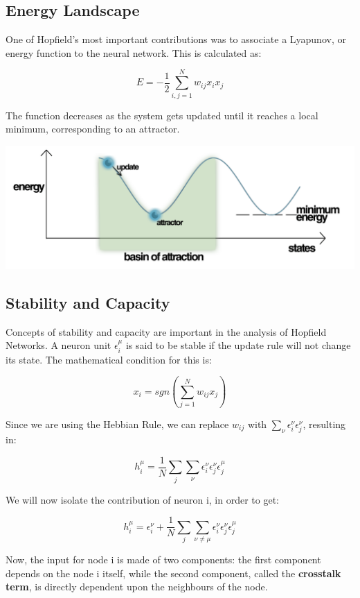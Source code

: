 \subsection{Energy Landscape}

One of Hopfield's most important contributions was to associate a Lyapunov, or energy function to the neural network. This is calculated as:

\[ E = -\frac{1}{2} \sum_{i,j=1}^{N}w_{ij}x_{i}x_{j} \]

The function decreases as the system gets updated until it reaches a local minimum, corresponding to an attractor.

\includegraphics[scale=0.25]{energy_landscape.png}

\subsection{Stability and Capacity}

Concepts of stability and capacity are important in the analysis of Hopfield Networks. A neuron unit \( \epsilon_{i}^{\mu}\) is said to be stable if the update rule will not change its state. The mathematical condition for this is:

 \[x_{i} = sgn(\sum_{j=1}^{N}w_{ij}x_{j}) \]

Since we are using the Hebbian Rule, we can replace \(w_{ij}\) with
\(\sum_{\nu}\epsilon_{i}^{\nu}\epsilon_{j}^{\nu}\), resulting in:

\[ h_{i}^{\mu} = \frac{1}{N}\sum_{j} \sum_{\nu} \epsilon_{i}^{\nu}
						 \epsilon_{j}^{\nu}
						 \epsilon_{j}^{\mu}\]
 
 We will now isolate the contribution of neuron i, in order to get:
 
\[ h_{i}^{\mu} = \epsilon_{i}^{\nu} + \frac{1}{N}\sum_{j} \sum_{\nu\neq\mu} 			 					 \epsilon_{i}^{\nu}
						 \epsilon_{j}^{\nu}
						 \epsilon_{j}^{\mu}\]
 
 Now, the input for node i is made of two components: the first component depends on the node i itself, while the second component, called the \textbf{crosstalk term}, is directly dependent upon the neighbours of the node. 
 
